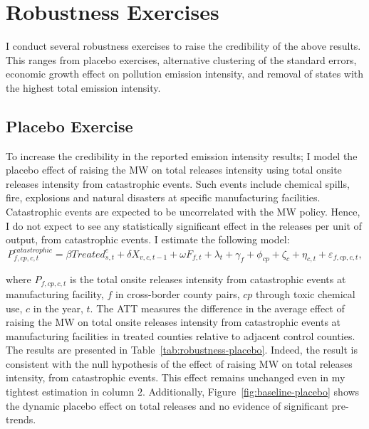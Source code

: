 \documentclass[12pt, english]{article}
\begin{document}
    \section{Robustness Exercises}\label{sec:robustness-exercises}
    I conduct several robustness exercises to raise the credibility of the above results. This ranges from placebo exercises, alternative clustering of the standard errors, economic growth effect on pollution emission intensity, and removal of states with the highest total emission intensity.

    \subsection{Placebo Exercise}\label{subsec:placebo-exercise}
    To increase the credibility in the reported emission intensity results; I model the placebo effect of raising the MW on total releases intensity using total onsite releases intensity from catastrophic events. Such events include chemical spills, fire, explosions and natural disasters at specific manufacturing facilities. Catastrophic events are expected to be uncorrelated with the MW policy. Hence, I do not expect to see any statistically significant effect in the releases per unit of output, from catastrophic events. I estimate the following model:
    \begin{equation}
        P_{f,cp,c,t}^{catastrophic} = \beta Treated_{s,t}^e + \delta X_{v,c,t-1} + \omega F_{f,t} + \lambda_{t} + \gamma_{f} + \phi_{cp} + \zeta_{c} + \eta_{c,t} + \varepsilon_{f,cp,c,t},\label{eq:robustness-placebo}
    \end{equation}
    

    where $P_{f,cp,c,t}$ is the total onsite releases intensity from catastrophic events at manufacturing facility, $f$ in cross-border county pairs, $cp$ through toxic chemical use, $c$ in the year, $t$. The ATT measures the difference in the average effect of raising the MW on total onsite releases intensity from catastrophic events at manufacturing facilities in treated counties relative to adjacent control counties. The results are presented in Table~\ref{tab:robustness-placebo}. Indeed, the result is consistent with the null hypothesis of the effect of raising MW on total releases intensity, from catastrophic events. This effect remains unchanged even in my tightest estimation in column $2$. Additionally, Figure~\ref{fig:baseline-placebo} shows the dynamic placebo effect on total releases and no evidence of significant pre-trends.
    
\end{document}
